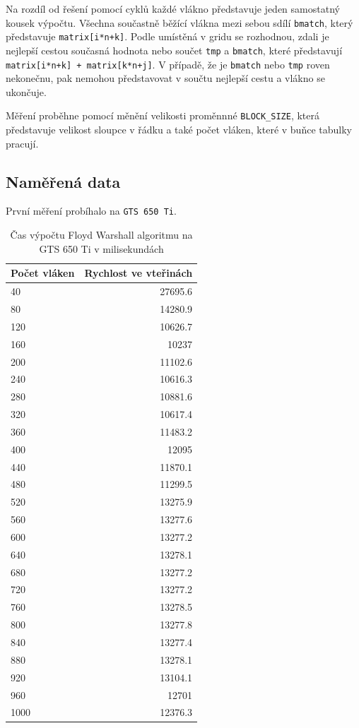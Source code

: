 \documentclass[a4paper,10pt]{article}
\begin{document}
Na rozdíl od řešení pomocí cyklů každé vlákno představuje jeden samostatný kousek výpočtu. Všechna součastně běžící vlákna mezi sebou sdílí \texttt{bmatch}, který představuje \texttt{matrix[i*n+k]}. Podle umístěná v gridu se rozhodnou, zdali je nejlepší cestou současná hodnota nebo součet \texttt{tmp} a \texttt{bmatch}, které představují \texttt{matrix[i*n+k] + matrix[k*n+j]}. V případě, že je \texttt{bmatch} nebo \texttt{tmp} roven nekonečnu, pak nemohou představovat v součtu nejlepší cestu a vlákno se ukončuje.

Měření proběhne pomocí měnění velikosti proměnnné \texttt{BLOCK\_SIZE}, která představuje velikost sloupce v řádku a také počet vláken, které v buňce tabulky pracují.

\subsection{Naměřená data}

První měření probíhalo na \texttt{GTS 650 Ti}. 

\begin{table}[H]
  \centering
	\caption{Čas výpočtu Floyd Warshall algoritmu na GTS 650 Ti v milisekundách}
	\begin{tabular}{| l | r |}
\hline
Počet vláken & Rychlost ve vteřinách \\ \hline
40 & 27695.6 \\ \hline
80 & 14280.9 \\ \hline
120 & 10626.7 \\ \hline
160 & 10237 \\ \hline
200 & 11102.6 \\ \hline
240 & 10616.3 \\ \hline
280 & 10881.6 \\ \hline
320 & 10617.4 \\ \hline
360 & 11483.2 \\ \hline
400 & 12095 \\ \hline
440 & 11870.1 \\ \hline
480 & 11299.5 \\ \hline
520 & 13275.9 \\ \hline
560 & 13277.6 \\ \hline
600 & 13277.2 \\ \hline
640 & 13278.1 \\ \hline
680 & 13277.2 \\ \hline
720 & 13277.2 \\ \hline
760 & 13278.5 \\ \hline
800 & 13277.8 \\ \hline
840 & 13277.4 \\ \hline
880 & 13278.1 \\ \hline
920 & 13104.1 \\ \hline
960 & 12701 \\ \hline
1000 & 12376.3 \\ \hline
	\end{tabular}
  \label{tab:cufl}
\end{table}
\end{document}
